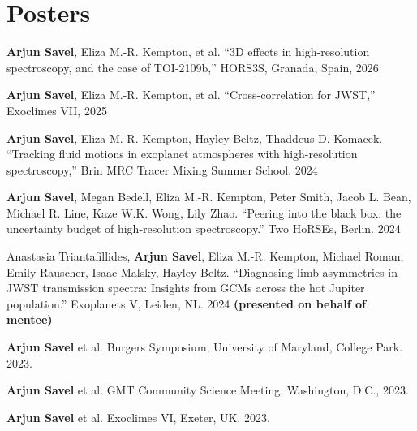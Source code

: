\documentclass[letterpaper,12pt]{article}
\newcommand{\shorterSection}[1]{\section{#1}}
\renewcommand{\small}{\normalsize}
\renewcommand{\scriptsize}{\normalsize}
\newcommand{\resumeSubHeadingListStart}[1][]{\begin{itemize}[leftmargin=*,#1]}
\begin{document}
\shorterSection{Posters}
\small
  \begin{list}{}{\cvlist}
  \item[{\color{numcolor}\scriptsize10}] \textbf{Arjun Savel}, Eliza M.-R. Kempton, et al. ``3D effects in high-resolution spectroscopy, and the case of TOI-2109b,'' HORS3S, Granada, Spain, 2026
    \item[{\color{numcolor}\scriptsize9}] \textbf{Arjun Savel}, Eliza M.-R. Kempton, et al. ``Cross-correlation for JWST,'' Exoclimes VII, 2025
  \item[{\color{numcolor}\scriptsize8}] \textbf{Arjun Savel}, Eliza M.-R. Kempton, Hayley Beltz, Thaddeus D. Komacek. ``Tracking fluid motions in exoplanet atmospheres with high-resolution spectroscopy,'' Brin MRC Tracer Mixing Summer School, 2024
  \item[{\color{numcolor}\scriptsize7}]\textbf{Arjun Savel}, Megan Bedell, Eliza M.-R. Kempton, Peter Smith, Jacob L. Bean, Michael R. Line, Kaze W.K. Wong, Lily Zhao. ``Peering into the black box: the uncertainty budget of high-resolution spectroscopy.'' Two HoRSEs, Berlin. 2024
  \item[{\color{numcolor}\scriptsize6}]Anastasia Triantafillides, \textbf{Arjun Savel}, Eliza M.-R. Kempton, Michael Roman, Emily Rauscher, Isaac Malsky, Hayley Beltz. ``Diagnosing limb asymmetries in JWST transmission spectra:
 Insights from GCMs across the hot Jupiter population.'' Exoplanets V, Leiden, NL. 2024 \textbf{(presented on behalf of mentee)}
  \item[{\color{numcolor}\scriptsize5}]\textbf{Arjun Savel} et al. Burgers Symposium, University of Maryland, College Park. 2023.
  
  \item[{\color{numcolor}\scriptsize4}]\textbf{Arjun Savel} et al. GMT Community Science Meeting, Washington, D.C., 2023.
  
  \item[{\color{numcolor}\scriptsize3}]\textbf{Arjun Savel} et al. Exoclimes VI, Exeter, UK. 2023.



\end{list}
\end{document}
